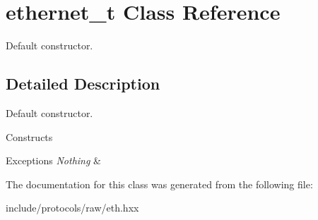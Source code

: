 \hypertarget{classethernet__t}{\section{ethernet\+\_\+t Class Reference}
\label{classethernet__t}
}


Default constructor.  




\subsection{Detailed Description}
Default constructor. 

Constructs
\begin{DoxyExceptions}{Exceptions}
{\em Nothing} & \\
\hline
\end{DoxyExceptions}


The documentation for this class was generated from the following file\+:\begin{DoxyCompactItemize}
\item 
include/protocols/raw/eth.\+hxx\end{DoxyCompactItemize}
